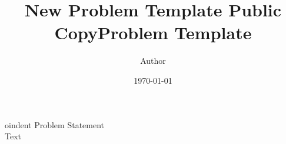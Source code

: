 \documentclass[letterpaper,12pt]{article}
\title{New Problem Template Public Copy}
\title{Problem Template}	%
\author{Author}		%
\date{\today}				%
\begin{document}
oindent Problem Statement
\\
Text
\end{document}
